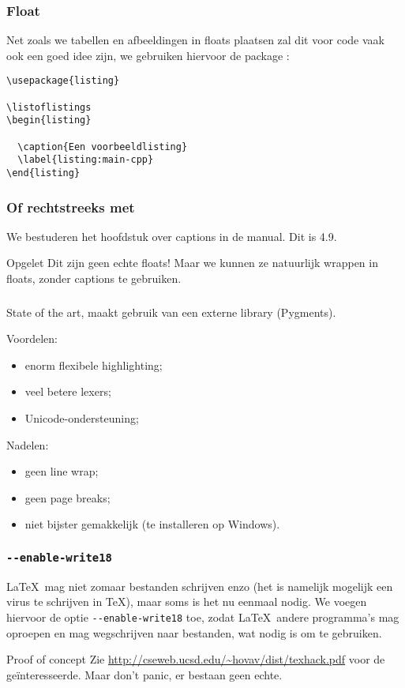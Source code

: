 \begin{frame}[fragile]
  \frametitle{Float}

  Net zoals we tabellen en afbeeldingen in floats plaatsen zal dit voor code vaak ook een goed idee zijn, we gebruiken hiervoor de package :
  \small
  \begin{verbatim}
\usepackage{listing}

\listoflistings
\begin{listing}
  
  \caption{Een voorbeeldlisting}
  \label{listing:main-cpp}
\end{listing}
\end{verbatim}
\end{frame}

\begin{frame}
  \frametitle{Of rechtstreeks met }

  We bestuderen het hoofdstuk over captions in de manual. Dit is 4.9.

  \begin{alertblock}{Opgelet}
    Dit zijn geen echte floats! Maar we kunnen ze natuurlijk wrappen in floats, zonder captions te gebruiken.
  \end{alertblock}
\end{frame}

\begin{frame}
  \frametitle{}

  State of the art, maakt gebruik van een externe library (Pygments).

  Voordelen:
  \small
  \begin{itemize}
    \item enorm flexibele highlighting;
    \item veel betere lexers;
    \item Unicode-ondersteuning;
  \end{itemize}

  \normalsize Nadelen:
  \small
  \begin{itemize}
    \item geen line wrap;
    \item geen page breaks;
    \item niet bijster gemakkelijk (te installeren op Windows).
  \end{itemize}
\end{frame}

\begin{frame}
  \frametitle{\texttt{-{-}enable-write18}}

  \LaTeX\ mag niet zomaar bestanden schrijven enzo (het is namelijk mogelijk een virus te schrijven in \TeX), maar soms is het nu eenmaal nodig. We voegen hiervoor de optie \texttt{-{-}enable-write18} toe, zodat \LaTeX\ andere programma's mag oproepen en mag wegschrijven naar bestanden, wat nodig is om  te gebruiken.

  \begin{alertblock}{Proof of concept}
    Zie \url{http://cseweb.ucsd.edu/~hovav/dist/texhack.pdf} voor de ge\"interesseerde. Maar don't panic, er bestaan geen echte.
  \end{alertblock}
\end{frame}

